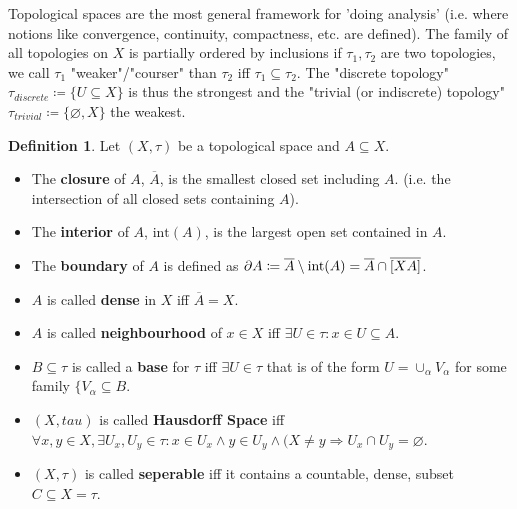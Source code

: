 \documentclass[10pt,a4paper]{article}
\theoremstyle{definition}
\newtheorem{definition}{Definition}
\theoremstyle{cor}
\theoremstyle{theorem}
\theoremstyle{lemma}
\theoremstyle{example}
\theoremstyle{remark}
\begin{document}
\noindent Topological spaces are the most general framework for 'doing analysis' (i.e. where notions like convergence, continuity, compactness, etc. are defined).  The family of all topologies on $X$ is partially ordered by inclusions if $\tau_1, \tau_2$ are two topologies, we call $\tau_1$ "weaker"/"courser" than $\tau_2$ iff $\tau_1 \subseteq \tau_2$. The "discrete topology" $\tau_{discrete} \coloneqq  \{U \subseteq X\}$ is thus the strongest and the "trivial (or indiscrete) topology" $\tau_{trivial}\coloneqq \{\varnothing, X\}$ the weakest.

\begin{definition}
Let $(X, \tau)$ be a topological space and $A \subseteq X$.
\begin{itemize}
\item The \textbf{closure} of $A$, $\overline{A}$, is the smallest closed set including $A$. (i.e. the intersection of all closed sets containing $A$).
\item The \textbf{interior} of $A$, $\text{int}(A)$, is the largest open set contained in $A$.
\item The \textbf{boundary} of $A$ is defined as $\partial A \coloneqq \overline{A} \setminus \text{int}(A) =  \overline{A} \cap \overline{[X\\A]}$.
\item $A$ is called \textbf{dense} in $X$ iff $\overline{A} = X$.
\item $A$ is called \textbf{neighbourhood} of $x\in X$ iff $\exists U \in \tau : x\in U \subseteq A$.
\item $B \subseteq \tau$ is called a \textbf{base} for $\tau$ iff $\exists U \in \tau$ that is of the form $U = \cup_{\alpha} V_{\alpha}$ for some family $\{ V_{\alpha} \subseteq B$.
\item $(X, tau)$ is called \textbf{Hausdorff Space} iff $\forall x, y \in X, \exists U_x, U_y \in \tau : x\in U_x \wedge y\in U_y \wedge (X \neq y \Rightarrow U_x \cap U_y = \varnothing$.
\item $(X, \tau)$ is called \textbf{seperable} iff it contains a countable, dense, subset $C \subseteq X = \tau$.
\end{itemize}
\end{definition}
\end{document}
